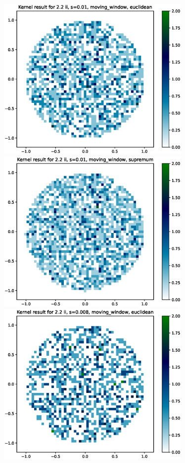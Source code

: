 \documentclass{article}
\begin{document}
\hspace*{-1.5cm}\includegraphics[height=8cm]{comparisons//Kernel_result_2-2ii_s_0-01_moving_window_euclidean.eps} \hspace*{-1.5cm}
\includegraphics[height=8cm]{comparisons//Kernel_result_2-2ii_s_0-01_moving_window_supremum.eps} \vspace*{-2.5em} \\
\hspace*{-1.5cm}\includegraphics[height=8cm]{comparisons//Kernel_result_2-2ii_s_0-008_moving_window_euclidean.eps} \hspace*{-1.5cm}
\end{document}
